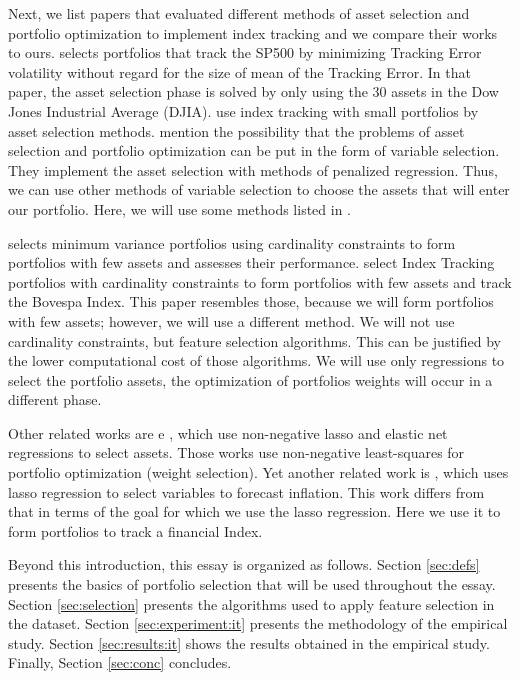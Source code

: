 \documentclass[12pt,oneside,a4paper]{memoir}
\begin{document}
Next, we list papers that evaluated different methods of asset selection and portfolio optimization to implement index tracking and we compare their works to ours.
%
 selects portfolios that track the SP500 by minimizing Tracking Error volatility without regard for the size of mean of the Tracking Error.
In that paper, the asset selection phase is solved by only using the 30 assets in the Dow Jones Industrial Average (DJIA).
 use index tracking with small portfolios by asset selection methods.
 mention the possibility that the problems of asset selection and portfolio optimization can be put in the form of variable selection.
They implement the asset selection with methods of penalized regression.
Thus, we can use other methods of variable selection to choose the assets that will enter our portfolio.
Here, we will use some methods listed in .

 selects minimum variance portfolios using cardinality constraints to form portfolios with few assets and assesses their performance.
 select Index Tracking portfolios with cardinality constraints to form portfolios with few assets and track the Bovespa Index.
This paper resembles those, because we will form portfolios with few assets; however, we will use a different method.
We will not use cardinality constraints, but feature selection algorithms.
This can be justified by the lower computational cost of those algorithms.
We will use only regressions to select the portfolio assets, the optimization of portfolios weights will occur in a different phase.

Other related works are  e , which use non-negative lasso and elastic net regressions to select assets.
Those works use non-negative least-squares for portfolio optimization (weight selection).
Yet another related work is , which uses lasso regression to select variables to forecast inflation.
This work differs from that in terms of the goal for which we use the lasso regression.
Here we use it to form portfolios to track a financial Index.

Beyond this introduction, this essay is organized as follows.
Section \ref{sec:defs} presents the basics of portfolio selection that will be used throughout the essay.
Section \ref{sec:selection} presents the algorithms used to apply feature selection in the dataset.
Section \ref{sec:experiment:it} presents the methodology of the empirical study.
Section \ref{sec:results:it} shows the results obtained in the empirical study.
Finally, Section \ref{sec:conc} concludes.
\end{document}
